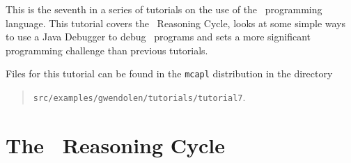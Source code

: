 
This is the seventh in a series of tutorials on the use of the \gwendolen\ programming language.  This tutorial covers the \gwendolen\ Reasoning Cycle, looks at some simple ways to use a Java Debugger to debug \gwendolen\ programs and sets a more significant programming challenge than previous tutorials.

Files for this tutorial can be found in the \texttt{mcapl} distribution in the directory
\begin{quote}
\texttt{src/examples/gwendolen/tutorials/tutorial7}.
\end{quote}

\section{The \gwendolen\ Reasoning Cycle}

